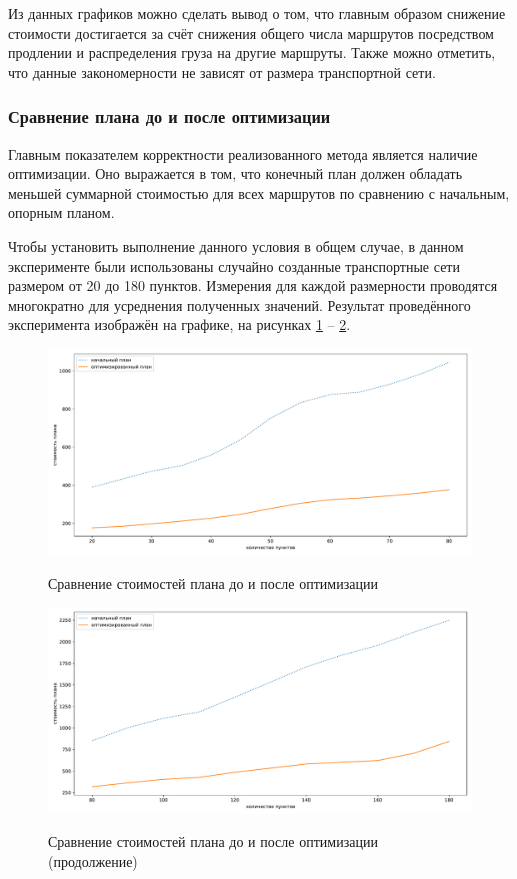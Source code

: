 Из данных графиков можно сделать вывод о том, что главным образом снижение стоимости достигается за счёт снижения общего числа маршрутов посредством продлении и распределения груза на другие маршруты. Также можно отметить, что данные закономерности не зависят от размера транспортной сети.

\subsubsection{Сравнение плана до и после оптимизации}
Главным показателем корректности реализованного метода является наличие оптимизации. Оно выражается в том, что конечный план должен обладать меньшей суммарной стоимостью для всех маршрутов по сравнению с начальным, опорным планом. 

Чтобы установить выполнение данного условия в общем случае, в данном эксперименте были использованы случайно созданные транспортные сети размером от 20 до 180 пунктов. Измерения для каждой размерности проводятся многократно для усреднения полученных значений. Результат проведённого эксперимента изображён на графике, на рисунках \ref{exp:cmp} -- \ref{exp:cmp2}.

\begin{figure}[h!]
	\begin{center}
		{\includegraphics[scale=0.5, angle=0, page=1]{research/cmp.pdf}}
		\caption{Сравнение стоимостей плана до и после оптимизации}
		\label{exp:cmp}
	\end{center}
\end{figure}

\begin{figure}[h!]
	\begin{center}
		{\includegraphics[scale=0.5, angle=0, page=1]{research/cmp2.pdf}}
		\caption{Сравнение стоимостей плана до и после оптимизации (продолжение)}
		\label{exp:cmp2}
	\end{center}
\end{figure}

